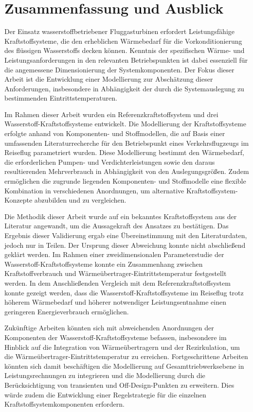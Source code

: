 \chapter{Zusammenfassung und Ausblick}
\label{chap:fazit}

Der Einsatz wasserstoffbetriebener Fluggasturbinen erfordert Leistungsfähige Kraftstoffsysteme, die den erheblichen Wärmebedarf für die Vorkonditionierung des flüssigen Wasserstoffs decken können. Kenntnis der spezifischen Wärme- und Leistungsanforderungen in den relevanten Betriebspunkten ist dabei essenziell für die angemessene Dimensionierung der Systemkomponenten. Der Fokus dieser Arbeit ist die Entwicklung einer Modellierung zur Abschätzung dieser Anforderungen, insbesondere in Abhängigkeit der durch die Systemauslegung zu bestimmenden Eintrittstemperaturen. 

Im Rahmen dieser Arbeit wurden ein Referenzkraftstoffsystem und drei Wasserstoff-Kraftstoffsysteme entwickelt. Die Modellierung der Kraftstoffsysteme erfolgte anhand von Komponenten- und Stoffmodellen, die auf Basis einer umfassenden Literaturrecherche für den Betriebspunkt eines Verkehrsflugzeugs im Reiseflug parametriert wurden. Diese Modellierung bestimmt den Wärmebedarf, die erforderlichen Pumpen- und Verdichterleistungen sowie den daraus resultierenden Mehrverbrauch in Abhängigkeit von den Auslegungsgrößen.  Zudem ermöglichen die zugrunde liegenden Komponenten- und Stoffmodelle eine flexible Kombination in verschiedenen Anordnungen, um alternative Kraftstoffsystem-Konzepte abzubilden und zu vergleichen.

Die Methodik dieser Arbeit wurde auf ein bekanntes Kraftstoffsystem aus der Literatur angewandt, um die Aussagekraft des Ansatzes zu bestätigen. Das Ergebnis dieser Validierung ergab eine Übereinstimmung mit den Literaturdaten, jedoch nur in Teilen. Der Ursprung dieser Abweichung konnte nicht abschließend geklärt werden. Im Rahmen einer zweidimensionalen Parameterstudie der Wasserstoff-Kraftstoffsysteme konnte ein Zusammenhang zwischen Kraftstoffverbrauch und Wärmeübertrager-Eintrittstemperatur festgestellt werden. In dem Anschließenden Vergleich mit dem Referenzkraftstoffsystem konnte gezeigt werden, dass die Wasserstoff-Kraftstoffsysteme im Reiseflug trotz höherem Wärmebedarf und höherer notwendiger Leistungsentnahme einen geringeren Energieverbrauch ermöglichen. 

Zukünftige Arbeiten könnten sich mit abweichenden Anordnungen der Komponenten der Wasserstoff-Kraftstoffsysteme befassen, insbesondere im Hinblick auf die Integration von Wärmeübertragern und der Rezirkulation, um die Wärmeübertrager-Eintrittstemperatur zu erreichen. Fortgeschrittene Arbeiten könnten sich damit beschäftigen die Modellierung auf Gesamttriebwerksebene in Leistungsrechnungen zu integrieren und die Modellierung durch die Berücksichtigung von transienten und Off-Design-Punkten zu erweitern. Dies würde zudem die Entwicklung einer Regelstrategie für die einzelnen Kraftstoffsystemkomponenten erfordern.